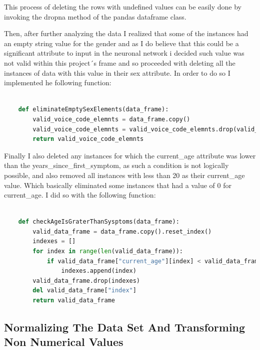 \documentclass[12pt, a4paper]{article}
\begin{document}
	This process of deleting the rows with undefined values can be easily done by invoking the dropna method of the pandas dataframe class.
	
	Then, after further analyzing the data I realized that some of the instances had an empty string value for the gender and as I do believe that this could be a significant attribute to input in the neuronal network i decided such value was not valid within this project´s frame and so proceeded with deleting all the instances of data with this value in their sex attribute. In order to do so I implemented he following function:
	
	\vspace{5mm}
	
	\begin{lstlisting}[language=Python]
		
	def eliminateEmptySexElements(data_frame):
		valid_voice_code_elemnts = data_frame.copy()
		valid_voice_code_elemnts = valid_voice_code_elemnts.drop(valid_voice_code_elemnts[valid_voice_code_elemnts["voice_code"] == "" ].index)
		return valid_voice_code_elemnts
	\end{lstlisting}
	
	Finally I also deleted any instances for which the current\_age attribute was lower than the years\_since\_first\_symptom, as such a condition is not logically possible, and also removed all instances with less than 20 as their current\_age value. Which basically eliminated some instances that had a value of 0 for current\_age. I did so with the following function:
	
	\vspace{5mm}
	
	\begin{lstlisting}[language=Python]
		
	def checkAgeIsGraterThanSysptoms(data_frame):
		valid_data_frame = data_frame.copy().reset_index()
		indexes = []
		for index in range(len(valid_data_frame)):
			if valid_data_frame["current_age"][index] < valid_data_frame["years_since_first_symptom"][index] or valid_data_frame["current_age"][index] < 20:
				indexes.append(index)
		valid_data_frame.drop(indexes)
		del valid_data_frame["index"]
		return valid_data_frame
	\end{lstlisting}
	
	\clearpage
	
	\subsection{Normalizing The Data Set And Transforming Non Numerical Values }
	
\end{document}
